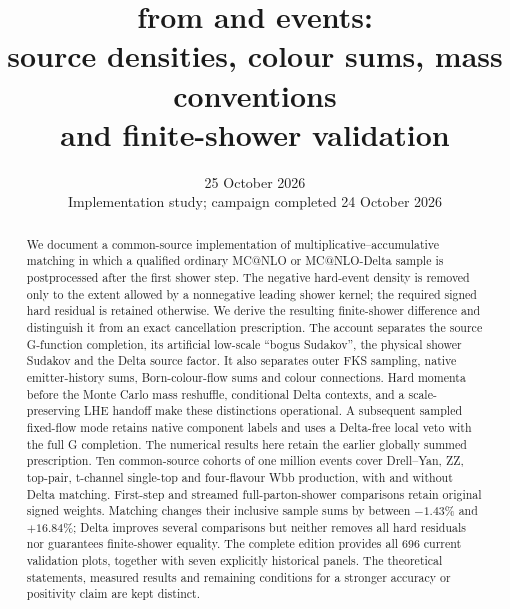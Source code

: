 \documentclass[11pt,a4paper]{article}
\title{\macnlops{} from \mcatnlo{} and \DeltaMC{} events:\\
source densities, colour sums, mass conventions\\and finite-shower validation}
\author{}
\date{25 October 2026\\\small Implementation study; campaign completed 24 October 2026}
\newif\ifallfigures
\begin{document}
\maketitle
\begin{abstract}
We document a common-source implementation of multiplicative--accumulative
matching in which a qualified ordinary MC@NLO or MC@NLO-Delta sample is
postprocessed after the first shower step. The negative hard-event density
is removed only to the extent allowed by a nonnegative leading shower
kernel; the required signed hard residual is retained otherwise. We
derive the resulting finite-shower difference and distinguish it from an
exact cancellation prescription. The account separates the source
G-function completion, its artificial low-scale ``bogus Sudakov'', the
physical shower Sudakov and the Delta source factor. It also separates
outer FKS sampling, native emitter-history sums, Born-colour-flow sums
and colour connections. Hard momenta before the Monte Carlo mass
reshuffle, conditional Delta contexts, and a scale-preserving LHE handoff
make these distinctions operational. A subsequent sampled fixed-flow
mode retains native component labels and uses a Delta-free local veto
with the full G completion. The numerical results here retain the earlier
globally summed prescription. Ten common-source cohorts of one
million events cover Drell--Yan, ZZ, top-pair, t-channel single-top and
four-flavour Wbb production, with and without Delta matching. First-step
and streamed full-parton-shower comparisons retain original signed
weights. Matching changes their inclusive sample sums by between
$-1.43\%$ and $+16.84\%$; Delta improves several comparisons but neither
removes all hard residuals nor guarantees finite-shower equality. The complete edition provides all
696 current validation plots, together with seven explicitly
historical panels. The theoretical statements, measured results and
remaining conditions for a stronger accuracy or positivity claim are
kept distinct.
\end{abstract}
\clearpage
\tableofcontents
\clearpage







\FloatBarrier


\clearpage
\appendix

\ifallfigures
\clearpage
\end{document}
